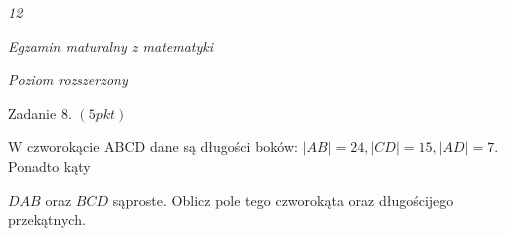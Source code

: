 \documentclass[a4paper,12pt]{article}
\begin{document}
{\it 12}

{\it Egzamin maturalny z matematyki}

{\it Poziom rozszerzony}

Zadanie 8. $(5pkt)$

$\mathrm{W}$ czworokącie ABCD dane są długości boków: $|AB|=24, |CD|=15, |AD|=7$. Ponadto kąty

$DAB$ oraz $BCD$ sąproste. Oblicz pole tego czworokąta oraz długościjego przekątnych.
\end{document}

